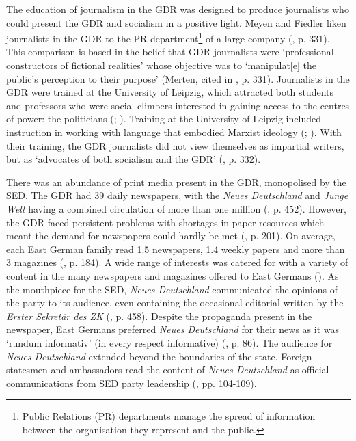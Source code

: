 The education of journalism in the GDR was designed to produce journalists who could present the GDR and socialism in a positive light. Meyen and Fiedler liken journalists in the GDR to the PR department\footnote{Public Relations (PR) departments manage the spread of information between the organisation they represent and the public.} of a large company (\citeyear{meyenfiedler2013}, p. 331). This comparison is based in the belief that GDR journalists were ‘professional constructors of fictional realities’ whose objective was to ‘manipulat[e] the public’s perception to their purpose’ (Merten, cited in \cite{meyenfiedler2013}, p. 331). Journalists in the GDR were trained at the University of Leipzig, which attracted both students and professors who were social climbers interested in gaining access to the centres of power: the politicians (\cite{meyenfiedler2013}; \cite{meyenwiedemann2017}). Training at the University of Leipzig included instruction in working with language that embodied Marxist ideology (\cite{holzweißig2002}; \cite{kurzmüllerpötschkepöttker2010}). With their training, the GDR journalists did not view themselves as impartial writers, but as ‘advocates of both socialism and the GDR’ (\cite{meyenfiedler2013}, p. 332).

There was an abundance of print media present in the GDR, monopolised by the SED. The GDR had 39 daily newspapers, with the \textit{Neues Deutschland} and \textit{Junge Welt} having a combined circulation of more than one million (\cite{fiedlermeyen2015}, p. 452). However, the GDR faced persistent problems with shortages in paper resources which meant the demand for newspapers could hardly be met (\cite{dussel2011}, p. 201). On average, each East German family read 1.5 newspapers, 1.4 weekly papers and more than 3 magazines (\cite{hanke1990}, p. 184). A wide range of interests was catered for with a variety of content in the many newspapers and magazines offered to East Germans (\cite{meyen2003}). As the mouthpiece for the SED, \textit{Neues Deutschland} communicated the opinions of the party to its audience, even containing the occasional editorial written by the \textit{Erster Sekretär des ZK} (\cite{fiedlermeyen2015}, p. 458). Despite the propaganda present in the newspaper, East Germans preferred \textit{Neues Deutschland} for their news as it was ‘rundum informativ’ (in every respect informative) (\cite{meyenschweiger2008}, p. 86). The audience for \textit{Neues Deutschland} extended beyond the boundaries of the state. Foreign statesmen and ambassadors read the content of \textit{Neues Deutschland} as official communications from SED party leadership (\cite{fiedler2014}, pp. 104-109).

